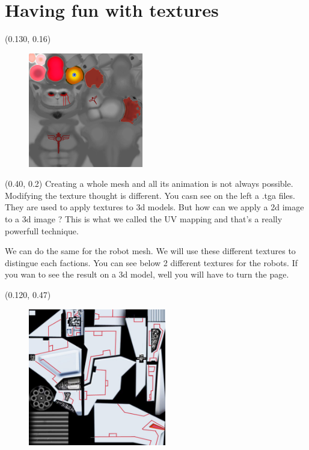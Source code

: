 \documentclass[article]{report}             %
\begin{document}
			\section{Having fun with textures}
				\begin{textblock}{0.628}(0.130, 0.16)
				\begin{figure}
					\includegraphics[width=5cm]{images/sinbad_body.png}
				\end{figure}
				\end{textblock}
				
				\begin{textblock}{0.575}(0.40, 0.2)
					Creating a whole mesh and all its animation is not always possible. Modifying the texture thought is different. You casn see on the left a .tga files. They are used to apply textures to 3d models. But how can we apply a 2d image to a 3d image ? This is what we called the UV mapping and that's a really powerfull technique.
				\end{textblock}
				
				\bigskip\bigskip\bigskip\bigskip\bigskip\bigskip\bigskip\bigskip\bigskip\bigskip\bigskip\bigskip\bigskip\bigskip\bigskip\bigskip\bigskip
				
				We can do the same for the robot mesh. We will use these different textures to distingue each factions. You can see below 2 different textures for the robots. If you wan to see the result on a 3d model, well you will have to turn the page.
				
				\begin{textblock}{0.628}(0.120, 0.47)
					\begin{figure}
						\includegraphics[width=6cm]{images/r2skin_K.jpg}
					\end{figure}
				\end{textblock}
				
\end{document}
